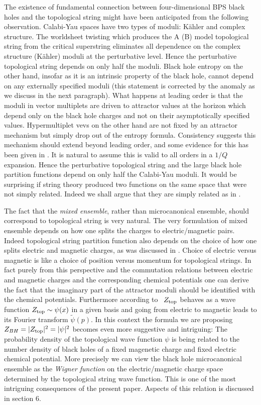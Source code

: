 The existence of fundamental connection between four-dimensional
BPS black holes and the topological string might have been
anticipated from the following observation. Calabi-Yau spaces have
two types of moduli: K\"ahler and complex structure. The
worldsheet twisting which produces the A (B) model topological
string from the critical superstring eliminates all dependence on
the complex structure (K\"ahler) moduli at the perturbative level.
Hence the perturbative topological string depends on only half the
moduli. Black hole entropy on the other hand, insofar as it is an
intrinsic property of the black hole, cannot depend on any
externally specified moduli (this statement is corrected by the anomaly
 as we
discuss in the next paragraph). What happens at leading order is that the moduli
in vector multiplets are driven to attractor values at the horizon
which depend only on the black hole charges and not on their
asymptotically specified values. Hypermultiplet vevs on the other
hand are not fixed by an attractor mechanism but simply drop out
of the entropy formula. Consistency suggests this mechanism should
extend beyond leading order, and some evidence for this has been
given in .  It is natural to assume this is valid
to all orders in a $1/Q$ expansion.
Hence the perturbative topological string and
the large black hole partition
functions depend on only half the Calabi-Yau moduli. It would be
surprising if string theory produced two functions on the same
space that were not simply related. Indeed we shall argue that
they are simply related as in \tui.


The fact that the {\it mixed ensemble},
rather than microcanonical ensemble, should correspond to topological
string is very natural. The very formulation of mixed ensemble
depends on how one splits the charges to electric/magnetic pairs.
Indeed topological string partition function also
depends on the choice of how one splits electric and magnetic charges,
as was discussed in \wittenqb .  Choice of electric versus
magnetic is like a choice of position versus momentum
for topological strings.  In fact purely from this perspective
and the commutation relations between electric and magnetic
charges and the corresponding chemical potentials one can derive
the fact that the imaginary part of the attractor moduli should
be identified with the chemical potentials.  Furthermore according
to \wittenqb\ $Z_{\rm top}$ behaves
as a wave function $Z_{\rm  top}\sim
\psi (x)$ in a given basis and going from electric
to magnetic leads to its Fourier transform
$\tilde \psi (p)$.   In this context
the formula we are proposing $Z_{BH}=|Z_{\rm top}|^2
=|\psi|^2$ becomes even more
suggestive and intriguing:  The probability density of the topological
wave function $\psi$ is being related to the number density of black
holes of a fixed magenetic charge and fixed electric chemical potential.
More precisely we can view the black hole microcanonical ensemble
as the {\it Wigner function} on the electric/magnetic charge space
determined by the topological string wave function.  This is one
of the most intriguing consequences of the present paper.
Aspects of this relation is discussed in section 6.

